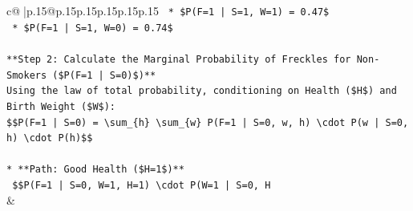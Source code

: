 \documentclass{article}
\begin{document}
{\begin{supertabular}{c@{$\;$}|p{.15\linewidth}@{}p{.15\linewidth}p{.15\linewidth}p{.15\linewidth}p{.15\linewidth}p{.15\linewidth}}
{{{\texttt{    *   \$P(F=1 | S=1, W=1) = 0.47\$} \\
\texttt{    *   \$P(F=1 | S=1, W=0) = 0.74\$} \\
\\ 
\texttt{**Step 2: Calculate the Marginal Probability of Freckles for Non{-}Smokers (\$P(F=1 | S=0)\$)**} \\
\texttt{Using the law of total probability, conditioning on Health (\$H\$) and Birth Weight (\$W\$):} \\
\texttt{\$\$P(F=1 | S=0) = \textbackslash{}sum\_\{h\} \textbackslash{}sum\_\{w\} P(F=1 | S=0, w, h) \textbackslash{}cdot P(w | S=0, h) \textbackslash{}cdot P(h)\$\$} \\
\\ 
\texttt{*   **Path: Good Health (\$H=1\$)**} \\
\texttt{    \$\$P(F=1 | S=0, W=1, H=1) \textbackslash{}cdot P(W=1 | S=0, H} \\
            }
        }
    }
    & \\ \\


\end{supertabular}}
\end{document}

